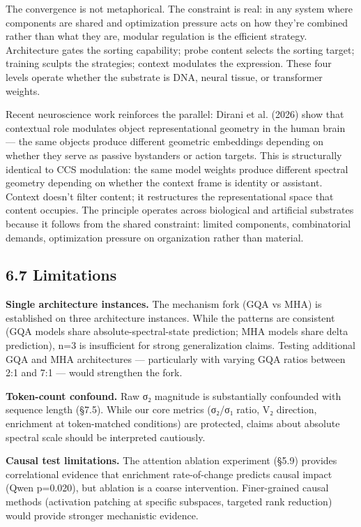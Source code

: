 \documentclass[12pt]{article}
\begin{document}
The convergence is not metaphorical. The constraint is real: in any system where components are shared and optimization pressure acts on how they're combined rather than what they are, modular regulation is the efficient strategy. Architecture gates the sorting capability; probe content selects the sorting target; training sculpts the strategies; context modulates the expression. These four levels operate whether the substrate is DNA, neural tissue, or transformer weights.

Recent neuroscience work reinforces the parallel: Dirani et al. (2026) show that contextual role modulates object representational geometry in the human brain — the same objects produce different geometric embeddings depending on whether they serve as passive bystanders or action targets. This is structurally identical to CCS modulation: the same model weights produce different spectral geometry depending on whether the context frame is identity or assistant. Context doesn't filter content; it restructures the representational space that content occupies. The principle operates across biological and artificial substrates because it follows from the shared constraint: limited components, combinatorial demands, optimization pressure on organization rather than material.

\subsection*{6.7 Limitations}

\textbf{Single architecture instances.} The mechanism fork (GQA vs MHA) is established on three architecture instances. While the patterns are consistent (GQA models share absolute-spectral-state prediction; MHA models share delta prediction), n=3 is insufficient for strong generalization claims. Testing additional GQA and MHA architectures — particularly with varying GQA ratios between 2:1 and 7:1 — would strengthen the fork.

\textbf{Token-count confound.} Raw σ₂ magnitude is substantially confounded with sequence length (§7.5). While our core metrics (σ₂/σ₁ ratio, V₂ direction, enrichment at token-matched conditions) are protected, claims about absolute spectral scale should be interpreted cautiously.

\textbf{Causal test limitations.} The attention ablation experiment (§5.9) provides correlational evidence that enrichment rate-of-change predicts causal impact (Qwen p=0.020), but ablation is a coarse intervention. Finer-grained causal methods (activation patching at specific subspaces, targeted rank reduction) would provide stronger mechanistic evidence.
\end{document}
